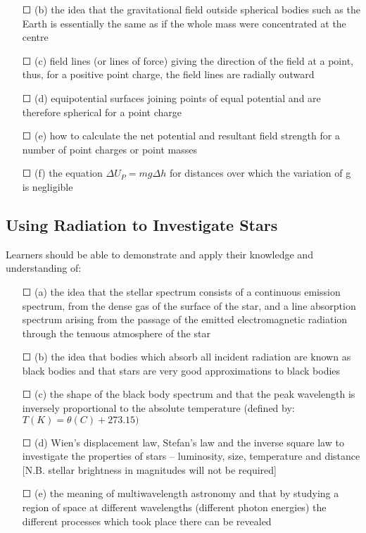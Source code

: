 \begin{itemize}
	\item[\Large{$\Square$}]		(b) the idea that the gravitational field outside spherical bodies such as the Earth is essentially the same as if the whole mass were concentrated at the centre
	\item[\Large{$\Square$}]		(c) field lines (or lines of force) giving the direction of the field at a point, thus, for	a positive point charge, the field lines are radially outward
	\item[\Large{$\Square$}]		(d) equipotential surfaces joining points of equal potential and are therefore spherical for a point charge
	\item[\Large{$\Square$}]		(e) how to calculate the net potential and resultant field strength for a number of point charges or point masses
	\item[\Large{$\Square$}]		(f) the equation $\Delta U_{P} = mg\Delta h$ for distances over which the variation of g is	negligible
\end{itemize}
\subsection{Using Radiation to Investigate Stars}Learners should be able to demonstrate and apply their knowledge and
understanding of:
\begin{itemize}
	\item[\Large{$\Square$}] (a) the idea that the stellar spectrum consists of a continuous emission spectrum, from the dense gas of the surface of the star, and a line absorption spectrum arising from the passage of the emitted electromagnetic radiation through the tenuous atmosphere of the star
	\item[\Large{$\Square$}]		(b) the idea that bodies which absorb all incident radiation are known as black bodies and that \sq stars are very good approximations to black bodies
	\item[\Large{$\Square$}]		(c) the shape of the black body spectrum and that the peak wavelength is inversely proportional to the absolute temperature (defined by:
	\(T (K) = \theta (C) + 273.15)\)
	\item[\Large{$\Square$}]		(d) Wien's displacement law, \sq Stefan's law and \sq the inverse square law to investigate the properties of stars – \sq luminosity, \sq size, \sq temperature and
	\sq distance [N.B. stellar brightness in magnitudes will not be required]
	\item[\Large{$\Square$}]		(e) the meaning of multiwavelength astronomy and that by studying a region of	space at different wavelengths (different photon energies) the different processes which took place there can be revealed
\end{itemize}
